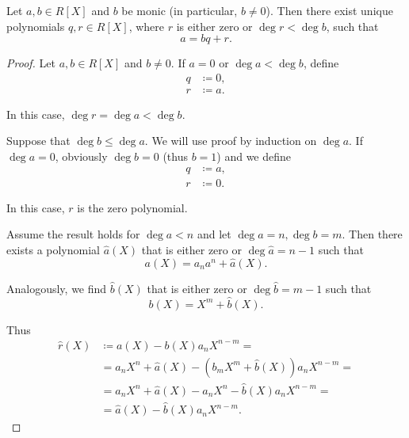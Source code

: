 \begin{theorem}\label{thm:euclidean_division_of_polynomials}\cite[10]{Knapp2016BAlg}
  Let \( a, b \in R[X] \) and \( b \) be monic (in particular, \( b \neq 0 \)). Then there exist unique polynomials \( q, r \in R[X] \), where \( r \) is either zero or \( \deg r < \deg b \), such that
  \begin{equation*}
    a = bq + r.
  \end{equation*}
\end{theorem}
\begin{proof}
  Let \( a, b \in R[X] \) and \( b \neq 0 \). If \( a = 0 \) or \( \deg a < \deg b \), define
  \begin{align*}
    q &\coloneqq 0, \\
    r &\coloneqq a.
  \end{align*}

  In this case, \( \deg r = \deg a < \deg b \).

  Suppose that \( \deg b \leq \deg a \). We will use proof by induction on \( \deg a \). If \( \deg a = 0 \), obviously \( \deg b = 0 \) (thus \( b = 1 \)) and we define
  \begin{align*}
    q &\coloneqq a, \\
    r &\coloneqq 0.
  \end{align*}

  In this case, \( r \) is the zero polynomial.

  Assume the result holds for \( \deg a < n \) and let \( \deg a = n, \deg b = m \). Then there exists a polynomial \( \hat a(X) \) that is either zero or \( \deg \hat a = n - 1 \) such that
  \begin{equation*}
    a(X) = a_n a^n + \hat a(X).
  \end{equation*}

  Analogously, we find \( \hat b(X) \) that is either zero or \( \deg \hat b = m - 1 \) such that
  \begin{equation*}
    b(X) = X^m + \hat b(X).
  \end{equation*}

  Thus
  \begin{align*}
    \hat r(X)
    &\coloneqq
    a(X) - b(X) a_n X^{n-m}
    = \\ &=
    a_n X^n + \hat a(X) - (b_m X^m + \hat b(X)) a_n X^{n-m}
    = \\ &=
    a_n X^n + \hat a(X) - a_n X^n - \hat b(X) a_n X^{n-m}
    = \\ &=
    \hat a(X) - \hat b(X) a_n X^{n-m}.
  \end{align*}


\end{proof}
